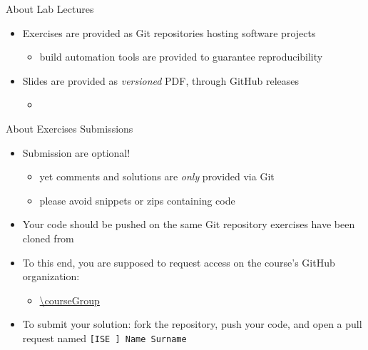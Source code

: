 \documentclass[presentation]{beamer}\mode<presentation>{\usetheme{AMSBolognaFC}}
\begin{document}
\begin{frame}[c,allowframebreaks]{About Lab Lectures}
\begin{itemize}
        \item Exercises are provided as Git repositories hosting software projects
        \begin{itemize}
			\item build automation tools are provided to guarantee reproducibility
        \end{itemize}

        \bigskip

        \item Slides are provided as \emph{versioned} PDF, through GitHub releases
        \begin{itemize}
            \item[eg] 
        \end{itemize}

    \end{itemize}

\end{frame}

\begin{frame}[c,allowframebreaks]{About Exercises Submissions}
\label{slide:submissions}

    \begin{itemize}
		\item Submission are optional!
        \begin{itemize}
            \item yet comments and solutions are \emph{only} provided via Git
            \item please avoid snippets or zips containing code
        \end{itemize}

		\medskip

        \item Your code should be pushed on the same \alert{Git repository} exercises have been cloned from

        \medskip

        \item To this end, you are supposed to request access on the course's GitHub organization:
        \begin{itemize}
            \item \url{\courseGroup}
        \end{itemize}

        \medskip

        \item To submit your solution: fork the repository, push your code, and open a pull request named \texttt{[ISE \academicYearShort] Name Surname}
    \end{itemize}
\end{frame}
\end{document}
